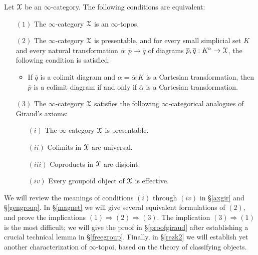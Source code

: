 \begin{theorem}\label{mainchar}
Let $\operatorname{\mathcal{X}}$ be an $\infty$-category. The following conditions are equivalent:

\begin{itemize}
\item[$(1)$] The $\infty$-category $\operatorname{\mathcal{X}}$ is an $\infty$-topos.

\item[$(2)$] The $\infty$-category $\operatorname{\mathcal{X}}$ is presentable, and for every small simplicial
set $K$ and every natural transformation
$\overline{\alpha}: \overline{p} \rightarrow \overline{q}$ of diagrams
$\overline{p}, \overline{q}: K^{\triangleright} \rightarrow \operatorname{\mathcal{X}}$, the following condition is satisfied:
\begin{itemize} 
\item
If $\overline{q}$ is a colimit diagram and $\alpha = \overline{\alpha} | K$ is a Cartesian transformation, then $\overline{p}$ is a colimit diagram if and only if $\overline{\alpha}$ is a Cartesian transformation.
\end{itemize}

\item[$(3)$] The $\infty$-category $\operatorname{\mathcal{X}}$ satisfies the following $\infty$-categorical analogues of Giraud's axioms:
\begin{itemize}
\item[$(i)$] The $\infty$-category $\operatorname{\mathcal{X}}$ is presentable.
\item[$(ii)$] Colimits in $\operatorname{\mathcal{X}}$ are universal.
\item[$(iii)$] Coproducts in $\operatorname{\mathcal{X}}$ are disjoint.
\item[$(iv)$] Every groupoid object of $\operatorname{\mathcal{X}}$ is effective.
\end{itemize}

\end{itemize}
\end{theorem}

We will review the meanings of conditions $(i)$ through $(iv)$ in \S \ref{axgir} and \S \ref{gengroup}.  In \S \ref{magnet} we will give several equivalent formulations of $(2)$, and prove the implications
$(1) \Rightarrow (2) \Rightarrow (3)$. The implication $(3) \Rightarrow (1)$ is the most difficult; we will give the proof in \S \ref{proofgiraud} after establishing a crucial technical lemma in \S \ref{freegroup}. Finally, in \S \ref{rezk2} we will establish yet another characterization of $\infty$-topoi, based on the theory of classifying objects.

